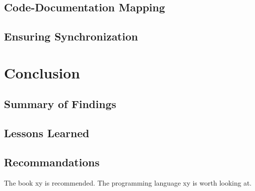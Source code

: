     \section{Code-Documentation Mapping}\label{sec:code-doc-mapping}
    \section{Ensuring Synchronization}\label{sec:synchronization}

\chapter{Conclusion}\label{chap:conclusion}
    \section{Summary of Findings}\label{sec:findings-summary}
    \section{Lessons Learned}\label{sec:lessons-learned}
    \section{Recommandations}
The book xy is recommended. The programming language xy is worth looking at.




